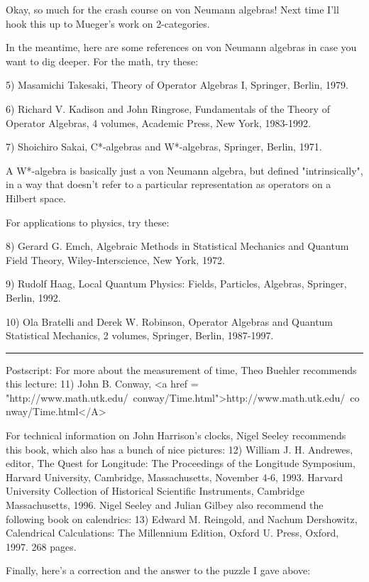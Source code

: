 Okay, so much for the crash course on von Neumann algebras!  Next time
I'll hook this up to Mueger's work on 2-categories.

In the meantime, here are some references on von Neumann algebras in
case you want to dig deeper.  For the math, try these:

5) Masamichi Takesaki, Theory of Operator Algebras I, Springer, 
Berlin, 1979.

6) Richard V. Kadison and John Ringrose, Fundamentals of the
Theory of Operator Algebras, 4 volumes, Academic Press, New York,
1983-1992.

7) Shoichiro Sakai, C*-algebras and W*-algebras, Springer, Berlin,
1971.

A W*-algebra is basically just a von Neumann algebra, but defined
"intrinsically", in a way that doesn't refer to a particular
representation as operators on a Hilbert space. 

For applications to physics, try these:

8) Gerard G. Emch, Algebraic Methods in Statistical Mechanics and Quantum
Field Theory, Wiley-Interscience, New York, 1972.

9) Rudolf Haag, Local Quantum Physics: Fields, Particles, Algebras,
Springer, Berlin, 1992.

10) Ola Bratelli and Derek W. Robinson, Operator Algebras and Quantum
Statistical Mechanics, 2 volumes, Springer, Berlin, 1987-1997.
\par\noindent\rule{\textwidth}{0.4pt}

Postscript:
For more about the measurement of time, 
Theo Buehler recommends this lecture:
11) John B. Conway, <a href = "http://www.math.utk.edu/~conway/Time.html">http://www.math.utk.edu/~conway/Time.html</A>

For technical information on John Harrison's clocks, Nigel Seeley
recommends this book, which also has a bunch of nice pictures:
12) William J. H. Andrewes, editor, The Quest for Longitude: The Proceedings
of the Longitude Symposium, Harvard University, Cambridge, Massachusetts,
November 4-6, 1993.  Harvard University Collection of Historical Scientific
Instruments, Cambridge Massachusetts, 1996.
Nigel Seeley and Julian Gilbey also recommend the following book on
calendrics:
13) Edward M. Reingold, and Nachum Dershowitz, Calendrical Calculations:
The Millennium Edition, Oxford U. Press, Oxford, 1997.
268 pages.

Finally, here's a correction and the answer to the puzzle I gave
above:



